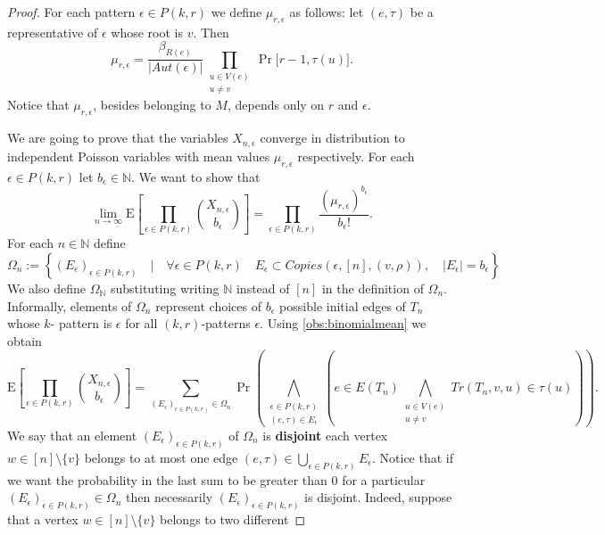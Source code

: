 \documentclass[12pt,notitlepage,a4paper]{article}
\theoremstyle{definition}
\newcommand{\N}{\mathbb{N}}
\newcommand{\Ln}{\lim\limits_{n\to \infty}}
\begin{document}
\begin{proof}
		For each pattern $\epsilon\in P(k,r)$ we define $\mu_{r,\epsilon}$ 
		as follows: let $(e,\tau)$ be a representative of $\epsilon$
		whose root is $v$. Then
		\[
		\mu_{r,\epsilon}=\frac{\beta_{R(e)}}{|Aut(\epsilon)|} 
		\prod_{\substack{u\in V(e)\\ u\neq v} } \Pr\big[
		r-1, \tau(u)\big].
		\]
		Notice that $\mu_{r,\epsilon}$, besides belonging to $M$, 
		depends only on $r$ and $\epsilon$. \par
		We are going to prove that the variables $X_{n,\epsilon}$
		converge in distribution to independent Poisson variables 
		with mean values $\mu_{r,\epsilon}$ respectively. For
		each $\epsilon\in P(k,r)$ let $b_\epsilon\in \N$. We want 
		to show that
		\begin{equation} \label{eqn:binomexpedges}
		\Ln
		\mathrm{E}
		\left[
		\prod_{\epsilon\in P(k,r)} \binom{X_{n,\epsilon}}{b_\epsilon}	
		\right]
		= \prod_{\epsilon\in P(k,r)} \frac{(\mu_{r,\epsilon})^
		{b_\epsilon}}{b_\epsilon!}.	
		\end{equation}
		For each $n\in \N$ define
		\[
		\Omega_n:=\left\{
		(E_\epsilon)_{\epsilon\in P(k,r)} \quad 
		\Big | \quad \forall \epsilon\in P(k,r) \quad
		E_\epsilon\subset Copies(\epsilon,[n],(v,\rho)), 
		\quad |E_\epsilon|=b_\epsilon	
		\right\}		
		\]
		We also define $\Omega_\N$ substituting writing $\N$
		instead of $[n]$ in the definition of $\Omega_n$. 
		Informally, elements of $\Omega_n$ represent choices of 
		$b_\epsilon$ possible initial edges of $T_n$ whose $k$-
		pattern is $\epsilon$ for all $(k,r)$-patterns $\epsilon$. 	
		Using \cref{obs:binomialmean} we obtain
		\[
		\mathrm{E}
		\left[
		\prod_{\epsilon\in P(k,r)} \binom{X_{n,\epsilon}}{b_\epsilon}	
		\right]
		= 
		\sum_{
		(E_\epsilon)_{\epsilon\in P(k,r)}
		\in \Omega_n}
		\Pr\left(
		\bigwedge_{\substack{
		\epsilon\in P(k,r)\\
		(e, \tau)\in E_{\epsilon}
		}} \left(
		e\in E(T_n) \bigwedge_{\substack{
		u\in V(e)\\
		u\neq v}} Tr(T_n,v,u)\in \tau(u)		
		\right)
		\right). 		
		\]
		We say that an element $(E_\epsilon)_{\epsilon\in P(k,r)}$
		of $\Omega_n$ is \textbf{disjoint} each vertex 
		$w\in [n]\setminus\{v\}$ belongs to at most one edge 
		$(e,\tau)\in\bigcup_{\epsilon\in P(k,r)} E_\epsilon$.
		Notice that if we want the probability in the last sum to be greater 
		than $0$ for a particular $(E_\epsilon)_{\epsilon\in P(k,r)}
		\in \Omega_n$ then necessarily $(E_\epsilon)_{\epsilon\in P(k,r)}$
		is disjoint. 
		Indeed, suppose that a vertex $w\in [n]\setminus \{v\}$ belongs to two different 

\end{proof}
\end{document}

